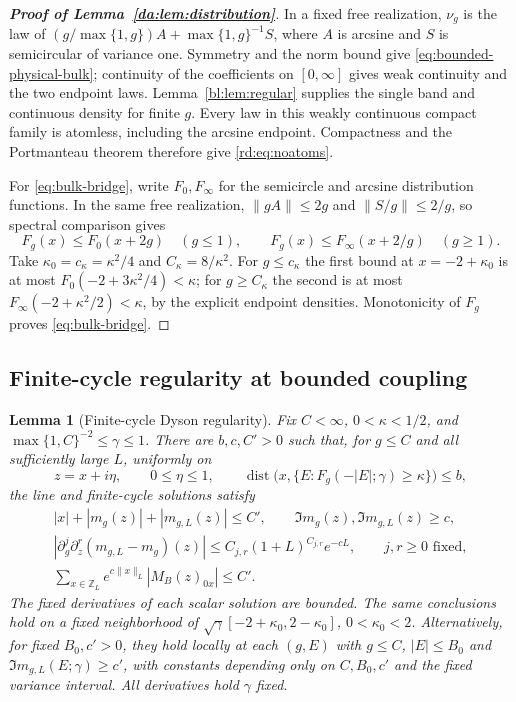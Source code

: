 \documentclass[11pt]{article}
\numberwithin{equation}{section}
\newtheorem{lemma}[theorem]{Lemma}
\theoremstyle{remark}
\newcommand{\Z}{\mathbb Z}
\begin{document}
\begin{proof}[\textbf{Proof of Lemma~\ref{da:lem:distribution}}]
In a fixed free realization, $\nu_g$ is the law of
$(g/\max\{1,g\})A+\max\{1,g\}^{-1}S$, where $A$ is arcsine and
$S$ is semicircular of variance one. Symmetry and the norm bound give
\eqref{eq:bounded-physical-bulk}; continuity of the coefficients on
$[0,\infty]$ gives weak continuity and the two endpoint laws.
Lemma~\ref{bl:lem:regular} supplies the single band and continuous
density for finite $g$.
Every law in this weakly continuous compact family is atomless,
including the arcsine endpoint. Compactness and the Portmanteau theorem
therefore give \eqref{rd:eq:noatoms}.

For \eqref{eq:bulk-bridge}, write $F_0,F_\infty$ for the semicircle
and arcsine distribution functions. In the same free realization,
$\|gA\|\le2g$ and $\|S/g\|\le2/g$, so spectral comparison gives
\[
 F_g(x)\le F_0(x+2g)\quad(g\le1),\qquad
 F_g(x)\le F_\infty(x+2/g)\quad(g\ge1).
\]
Take $\kappa_0=c_\kappa=\kappa^2/4$ and $C_\kappa=8/\kappa^2$.
For $g\le c_\kappa$ the first bound at $x=-2+\kappa_0$ is at most
$F_0(-2+3\kappa^2/4)<\kappa$; for $g\ge C_\kappa$ the second is at most
$F_\infty(-2+\kappa^2/2)<\kappa$, by the explicit endpoint densities.
Monotonicity of $F_g$ proves \eqref{eq:bulk-bridge}.
\end{proof}

\subsection{Finite-cycle regularity at bounded coupling}
\label{sec:bl-kernels}

\begin{lemma}[Finite-cycle Dyson regularity]\label{bl:lem:finite}
Fix $C<\infty$, $0<\kappa<1/2$, and
$\max\{1,C\}^{-2}\le\gamma\le1$. There are $b,c,C'>0$ such that, for
$g\le C$ and all sufficiently large $L$, uniformly on
\begin{equation}\label{da:eq:finite-domain}
 z=x+i\eta,\qquad 0\le\eta\le1,\qquad
 \operatorname{dist}\bigl(x,\{E:F_g(-|E|;\gamma)\ge\kappa\}\bigr)\le b,
\end{equation}
the line and finite-cycle solutions satisfy
\begin{equation}\label{da:eq:finite-regularity}
 \begin{gathered}
 |x|+|m_g(z)|+|m_{g,L}(z)|\le C',\qquad
 \Im m_g(z),\Im m_{g,L}(z)\ge c,\\
 |\partial_g^j\partial_z^r(m_{g,L}-m_g)(z)|
       \le C_{j,r}(1+L)^{C_{j,r}}e^{-cL},\qquad j,r\ge0\text{ fixed},\\
 \sum_{x\in\Z_L}e^{c\|x\|_L}|M_B(z)_{0x}|\le C'.
 \end{gathered}
\end{equation}
The fixed derivatives of each scalar solution are bounded. The same
conclusions hold on a fixed neighborhood of
$\sqrt\gamma[-2+\kappa_0,2-\kappa_0]$, $0<\kappa_0<2$.
Alternatively, for fixed $B_0,c'>0$, they hold locally at each
$(g,E)$ with $g\le C$, $|E|\le B_0$ and
$\Im m_{g,L}(E;\gamma)\ge c'$, with constants
depending only on $C,B_0,c'$ and the fixed variance interval.
All derivatives hold $\gamma$ fixed.
\end{lemma}
\end{document}
